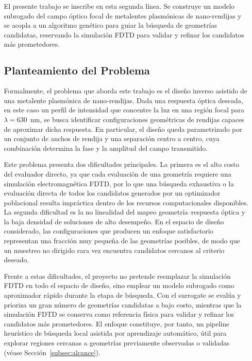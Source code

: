 El presente trabajo se inscribe en esta segunda línea. Se construye un modelo subrogado del campo óptico focal de metalentes plasmónicas de nano-rendijas y se acopla a un algoritmo genético para guiar la búsqueda de geometrías candidatas, reservando la simulación FDTD para validar y refinar los candidatos más prometedores.

\subsection{Planteamiento del Problema}\label{subsec:planteamiento}

Formalmente, el problema que aborda este trabajo es el diseño inverso asistido de una metalente plasmónica de nano-rendijas. Dada una respuesta óptica deseada, en este caso un perfil de intensidad que concentre la luz en una región focal para $\lambda = 630$~nm, se busca identificar configuraciones geométricas de rendijas capaces de aproximar dicha respuesta. En particular, el diseño queda parametrizado por un conjunto de anchos de rendija y una separación centro a centro, cuya combinación determina la fase y la amplitud del campo transmitido.

Este problema presenta dos dificultades principales. La primera es el alto costo del evaluador directo, ya que cada evaluación de una geometría requiere una simulación electromagnética FDTD, por lo que una búsqueda exhaustiva o la evaluación directa de todos los candidatos generados por un optimizador poblacional resulta impráctica dentro de los recursos computacionales disponibles. La segunda dificultad es la no linealidad del mapeo geometría--respuesta óptica y la baja densidad de soluciones de alto desempeño. En el espacio de diseño considerado, las configuraciones que producen un enfoque satisfactorio representan una fracción muy pequeña de las geometrías posibles, de modo que un muestreo no dirigido rara vez encuentra candidatos cercanos al criterio deseado.

Frente a estas dificultades, el proyecto no pretende reemplazar la simulación FDTD en todo el espacio de diseño, sino emplear un modelo subrogado como aproximador rápido durante la etapa de búsqueda. Con el surrogate se evalúa y prioriza un gran número de geometrías candidatas a bajo costo, mientras que la simulación FDTD se conserva como referencia física para validar y refinar los candidatos más prometedores. El enfoque constituye, por tanto, un pipeline heurístico de búsqueda local asistida por aprendizaje automático, útil para explorar regiones cercanas a geometrías previamente observadas o validadas (véase Sección~\ref{subsec:alcance}).

